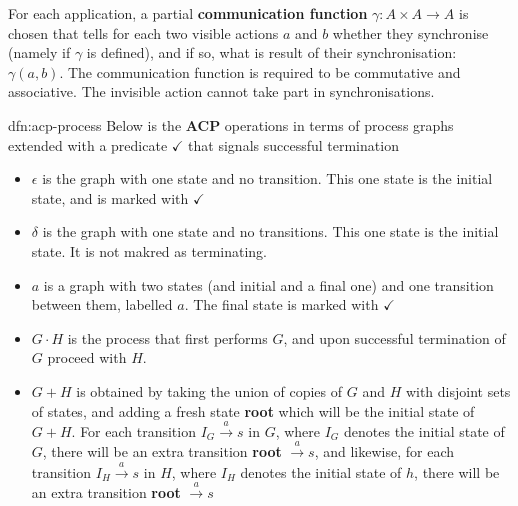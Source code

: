 \documentclass{article}
\begin{document}
For each application, a partial \textbf{communication function} $\gamma : A \times A \to A$ is chosen that tells for each two visible actions $a$ and $b$ whether they synchronise (namely if $\gamma$ is defined), and if so, what is result of their synchronisation: $\gamma(a,b)$. The communication function is required to be commutative and associative. The invisible action cannot take part in synchronisations.


\newpage
\begin{dfn}{dfn:acp-process}{}
    Below is the \textbf{ACP} operations in terms of process graphs extended with a predicate $\checkmark$ that signals successful termination

    \begin{itemize}
        \item $\epsilon$ is the graph with one state and no transition. This one state is the initial state, and is marked with $\checkmark$
        \item $\delta$ is the graph with one state and no transitions. This one state is the initial state. It is not makred as terminating.
        \item $a$ is a graph with two states (and initial and a final one) and one transition between them, labelled $a$. The final state is marked with $\checkmark$
        \item $G \cdot H$ is the process that first performs $G$, and upon successful termination of $G$ proceed with $H$. 
        \item $G + H$ is obtained by taking the union of copies of $G$ and $H$ with disjoint sets of states, and adding a fresh state \textbf{root} which will be the initial state of $G + H$. For each transition $I_{G} \xrightarrow{a} s$ in $G$, where $I_{G}$ denotes the initial state of $G$, there will be an extra transition \textbf{root} $\xrightarrow{a} s$, and likewise, for each transition $I_{H} \xrightarrow{a} s$ in $H$, where $I_{H}$ denotes the initial state of $h$, there will be an extra transition \textbf{root} $\xrightarrow{a} s$


\end{itemize}
\end{dfn}
\end{document}
